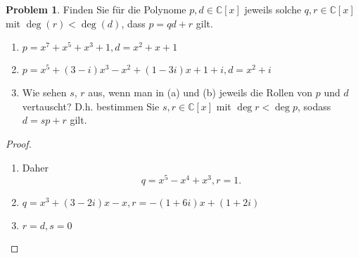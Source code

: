\documentclass[prb,12pt]{revtex4-2}
\theoremstyle{definition}
\newtheorem{Problem}{Problem}
\theoremstyle{definition}
\newenvironment{parts}{\begin{enumerate}[label=(\alph*)]}{\end{enumerate}}
\newcommand{\C}{\mathbb{C}}
\begin{document}
\begin{Problem}
	Finden Sie f\"{u}r die Polynome $p,d\in \C[x]$ jeweils solche $q,r\in \C[x]$ mit $\deg(r)<\deg(d)$, dass $p=qd+r$ gilt.
	\begin{parts}
	\item $p=x^7+x^5+x^3+1, d=x^2+x+1$
	\item $p=x^5+(3-i)x^3-x^2+(1-3i)x+1+i,d=x^2+i$
	\item  Wie sehen $s$, $r$ aus, wenn man in (a) und (b) jeweils die Rollen von $p$ und $d$ vertauscht? D.h. bestimmen Sie $s,r\in \C[x]$ mit $\deg r < \deg p$, sodass $d=sp+r$ gilt.
	\end{parts}
\end{Problem}
\begin{proof}
	\begin{parts}
	\item 

		Daher
		\[
		q=x^5-x^4+x^3, r=1
		.\]
	\item $q=x^3+(3-2i)x-x, r=-(1+6i)x+(1+2i)$
	\item $r=d, s=0$
	\end{parts}
\end{proof}
\end{document}
